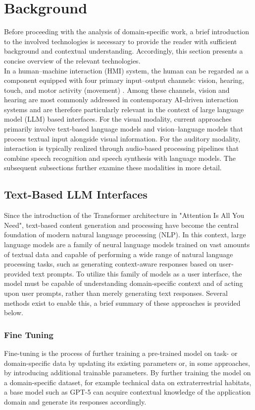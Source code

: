 \section{Background}
\label{sec:method}

Before proceeding with the analysis of domain-specific work, a brief introduction to the involved technologies is necessary to provide the reader with sufficient background and contextual understanding. Accordingly, this section presents a concise overview of the relevant technologies.\\

In a human–machine interaction (HMI) system, the human can be regarded as a component equipped with four primary input–output channels: vision, hearing, touch, and motor activity (movement) \cite{dix2004hci}.
Among these channels, vision and hearing are most commonly addressed in contemporary AI-driven interaction systems and are therefore particularly relevant in the context of large language model (LLM) based interfaces.
For the visual modality, current approaches primarily involve text-based language models and vision–language models that process textual input alongside visual information.
For the auditory modality, interaction is typically realized through audio-based processing pipelines that combine speech recognition and speech synthesis with language models.
The subsequent subsections further examine these modalities in more detail.

\subsection{Text-Based LLM Interfaces}
Since the introduction of the Transformer architecture in "Attention Is All You Need", text-based content generation and processing have become the central foundation of modern natural language processing (NLP).\cite{vaswani2017attention}
In this context, large language models are a family of neural language models trained on vast amounts of textual data and capable of performing a wide range of natural language processing tasks, such as generating context-aware responses based on user-provided text prompts.\cite{brown2020language}
To utilize this family of models as a user interface, the model must be capable of understanding domain-specific context and of acting upon user prompts, rather than merely generating text responses. 
Several methods exist to enable this, a brief summary of these approaches is provided below.

\subsubsection{Fine Tuning}
Fine-tuning is the process of further training a pre-trained model on task- or domain-specific data by updating its existing parameters or, in some approaches, by introducing additional trainable parameters.\cite{mosbach2023analyzing}
By further training the model on a domain-specific dataset, for example technical data on extraterrestrial habitats, a base model such as GPT-5 can acquire contextual knowledge of the application domain and generate its responses accordingly.

